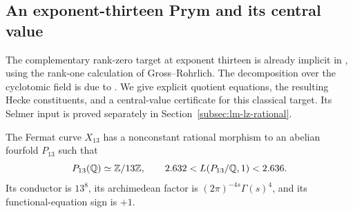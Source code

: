 \subsection{An exponent-thirteen Prym and its central value}
\label{subsec:thirteen}

The complementary rank-zero target at exponent thirteen is already
implicit in \citet[Proposition~2.1 and Corollary~2.2, p.~942]{Tzermias2004},
using the rank-one calculation of Gross--Rohrlich. The decomposition
over the cyclotomic field is due to
\citet[Theorem~6.2 and Corollary~6.3, pp.~89--90]{Lim1992}.
We give explicit quotient equations, the resulting Hecke constituents,
and a central-value certificate for this classical target. Its Selmer
input is proved separately in Section~\ref{subsec:lm-lz-rational}.

\begin{proposition}\label{prop:thirteenpartial}
The Fermat curve $X_{13}$ has a nonconstant rational morphism to an
abelian fourfold $P_{13}$ such that
\[
 P_{13}(\mathbb Q)\simeq\mathbb Z/13\mathbb Z,\qquad
 2.632<L(P_{13}/\mathbb Q,1)<2.636.
\]
Its conductor is $13^8$, its archimedean factor is
$(2\pi)^{-4s}\Gamma(s)^4$, and its functional-equation sign is $+1$.
\end{proposition}
